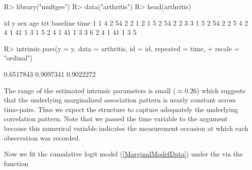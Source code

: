 \documentclass[
]{jss}
\begin{document}
\begin{CodeChunk}
\begin{CodeInput}
R> library("multgee")
R> data("arthritis")
R> head(arthritis)
\end{CodeInput}
\begin{CodeOutput}
  id y sex age trt baseline time
1  1 4   2  54   2        2    1
2  1 5   2  54   2        2    3
3  1 5   2  54   2        2    5
4  2 4   1  41   1        3    1
5  2 4   1  41   1        3    3
6  2 4   1  41   1        3    5
\end{CodeOutput}
\begin{CodeInput}
R> intrinsic.pars(y = y, data = arthritis, id = id, repeated = time,
+                   rscale = "ordinal")
\end{CodeInput}
\begin{CodeOutput}
[1] 0.6517843 0.9097341 0.9022272
\end{CodeOutput}
\end{CodeChunk}

The range of the estimated intrinsic parameters is small
(\(\approx 0.26\)) which suggests that the underlying marginalized
association pattern is nearly constant across time-pairs. Thus we expect
the  structure to capture adequately the underlying
correlation pattern. Note that we passed the time variable to the
 argument because this numerical variable indicates the
measurement occasion at which each observation was recorded.

Now we fit the cumulative logit model (\ref{MarginalModelData}) under
the  via the function 
\end{document}
